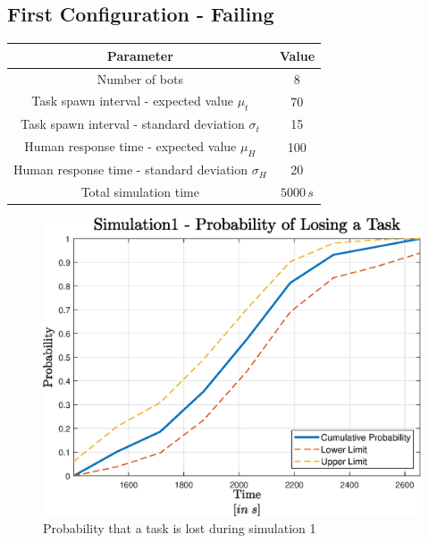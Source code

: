 \documentclass{article}
\begin{document}
		\subsection{First Configuration - Failing}
			\label{sub:sim1}
			\begin{center}
				\begin{tabular}{ |c|c|}
					\hline
					Parameter & Value \\
					\hline
					\hline
					Number of bots & 8\\
					\hline
					Task spawn interval - expected value $\mu_t$ & 70\\
					\hline					
					Task spawn interval - standard deviation $\sigma_t$ & 15\\
					\hline
					Human response time - expected value $\mu_H$ & 100\\
					\hline					
					Human response time - standard deviation $\sigma_H$ & 20\\
					\hline
					Total simulation time & $5000\, s$ \\
					\hline
				\end{tabular}
			\end{center}
			\begin{figure}[H]
				\centering
				\includegraphics[scale = 0.7]{Images/Simulation1}
				\caption{Probability that a task is lost during simulation 1}
				\label{fig:sim1}
			\end{figure}
		
\end{document}
